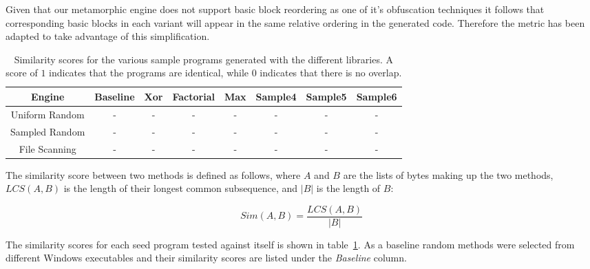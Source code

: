 \documentclass[finalcopy,short]{srpaper}
\begin{document}
        Given that our metamorphic engine does not support basic block
        reordering as one of it's obfuscation techniques it follows that
        corresponding basic blocks in each variant will appear in the same
        relative ordering in the generated code. Therefore the metric has been
        adapted to take advantage of this simplification.

        \begin{table}
            \centering
            \begin{tabular}{|c||c|c|c|c|c|c|c|}
                \hline
                Engine & Baseline & Xor & Factorial & Max & Sample4 & Sample5 & Sample6 \\
                \hline
                Uniform Random  & - & - & - & - & - & - & - \\
                \hline
                Sampled Random  & - & - & - & - & - & - & - \\
                \hline
                File Scanning   & - & - & - & - & - & - & - \\
                \hline
            \end{tabular}
            \caption{Similarity scores for the various sample programs generated
            with the different libraries. A score of $1$ indicates that the
            programs are identical, while $0$ indicates that there is no
            overlap.}
            \label{tab:results-different}
        \end{table}

        The similarity score between two methods is defined as follows, where
        $A$ and $B$ are the lists of bytes making up the two methods, $LCS(A,B)$
        is the length of their longest common subsequence, and $|B|$ is the
        length of $B$:

        $$Sim(A,B) = \frac{LCS(A,B)}{|B|}$$

        The similarity scores for each seed program tested against itself is
        shown in table~\ref{tab:results-different}. As a baseline random methods
        were selected from different Windows executables and their similarity
        scores are listed under the \emph{Baseline} column.

     
\end{document}
